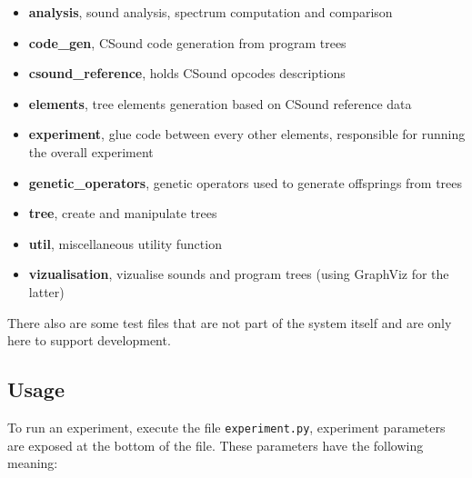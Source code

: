 \documentclass{article}
\newcommand{\code}[1]{\texttt{#1}}
\begin{document}
\begin{itemize}
  
\item \textbf{analysis}, sound analysis, spectrum computation and comparison

\item \textbf{code\_gen}, CSound code generation from program trees

\item \textbf{csound\_reference}, holds CSound opcodes descriptions

\item \textbf{elements}, tree elements generation based on CSound reference data

\item \textbf{experiment}, glue code between every other elements, responsible for running the overall experiment

\item \textbf{genetic\_operators}, genetic operators used to generate offsprings from trees

\item \textbf{tree}, create and manipulate trees

\item \textbf{util}, miscellaneous utility function

\item \textbf{vizualisation}, vizualise sounds and program trees (using GraphViz for the latter)

\end{itemize}

There also are some test files that are not part of the system itself and are only here to support development.

\subsection{Usage}

To run an experiment, execute the file \code{experiment.py}, experiment parameters are exposed at the bottom of the file. These parameters have the following meaning:
\end{document}
